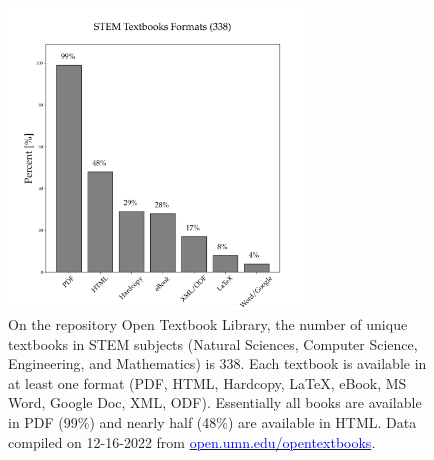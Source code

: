 \documentclass[11pt]{article}
\newcommand{\alink}[2]{\href{#1}{\textcolor{blue}{#2}}}
\begin{document}
\begin{figure}
  \centering
  \includegraphics[width=80mm]{stem-textbook-formats.png}
  \caption{On the repository Open Textbook Library, the number of unique textbooks in STEM subjects (Natural Sciences, Computer Science, Engineering, and Mathematics) is 338.  Each textbook is available in at least one format (PDF, HTML, Hardcopy, LaTeX, eBook, MS Word, Google Doc, XML, ODF). Essentially all books are available in PDF (99\%) and nearly half (48\%) are available in HTML.  Data compiled on 12-16-2022 from \alink{open.umn.edu/opentextbooks}{open.umn.edu/opentextbooks}.}
  \label{fig:open-book-formats}
\end{figure}
\end{document}
